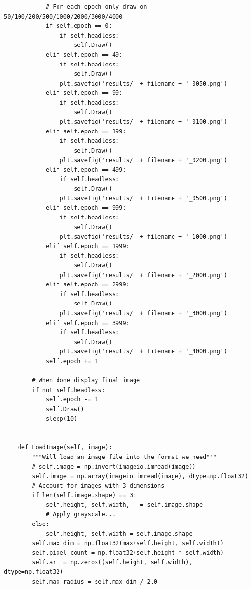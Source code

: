 \documentclass[12pt]{article}
\begin{document}
\begin{verbatim}
            # For each epoch only draw on 50/100/200/500/1000/2000/3000/4000
            if self.epoch == 0:
                if self.headless:
                    self.Draw()
            elif self.epoch == 49:
                if self.headless:
                    self.Draw()
                plt.savefig('results/' + filename + '_0050.png')
            elif self.epoch == 99:
                if self.headless:
                    self.Draw()
                plt.savefig('results/' + filename + '_0100.png')
            elif self.epoch == 199:
                if self.headless:
                    self.Draw()
                plt.savefig('results/' + filename + '_0200.png')
            elif self.epoch == 499:
                if self.headless:
                    self.Draw()
                plt.savefig('results/' + filename + '_0500.png')
            elif self.epoch == 999:
                if self.headless:
                    self.Draw()
                plt.savefig('results/' + filename + '_1000.png')
            elif self.epoch == 1999:
                if self.headless:
                    self.Draw()
                plt.savefig('results/' + filename + '_2000.png')
            elif self.epoch == 2999:
                if self.headless:
                    self.Draw()
                plt.savefig('results/' + filename + '_3000.png')
            elif self.epoch == 3999:
                if self.headless:
                    self.Draw()
                plt.savefig('results/' + filename + '_4000.png')
            self.epoch += 1

        # When done display final image
        if not self.headless:
            self.epoch -= 1
            self.Draw()
            sleep(10)


    def LoadImage(self, image):
        """Will load an image file into the format we need"""
        # self.image = np.invert(imageio.imread(image))
        self.image = np.array(imageio.imread(image), dtype=np.float32)
        # Account for images with 3 dimensions
        if len(self.image.shape) == 3:
            self.height, self.width, _ = self.image.shape
            # Apply grayscale...
        else:
            self.height, self.width = self.image.shape
        self.max_dim = np.float32(max(self.height, self.width))
        self.pixel_count = np.float32(self.height * self.width)
        self.art = np.zeros((self.height, self.width), dtype=np.float32)
        self.max_radius = self.max_dim / 2.0


\end{verbatim}
\end{document}
